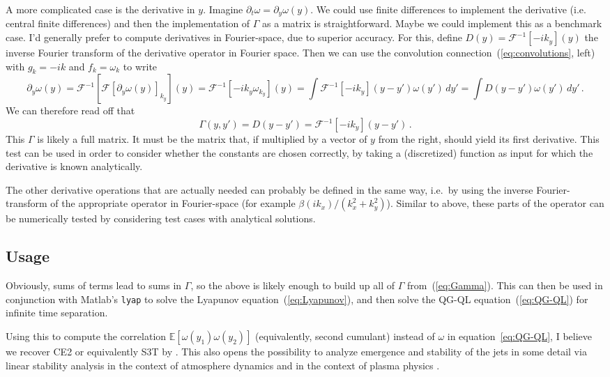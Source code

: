 \documentclass[11pt,reqno,a4paper]{amsart}
\newcommand{\EE}{\mathbb{E}}
\theoremstyle{definition}
\begin{document}
A more complicated case is the derivative in $y$. Imagine $\partial_t
\omega = \partial_y \omega(y)$. We could use finite differences to
implement the derivative (i.e. central finite differences) and then
the implementation of $\Gamma$ as a matrix is straightforward. Maybe
we could implement this as a benchmark case. I'd generally prefer to
compute derivatives in Fourier-space, due to superior accuracy. For
this, define $D(y) = \mathcal F^{-1}[-ik_y](y)$ the inverse Fourier
transform of the derivative operator in Fourier space. Then we can use
the convolution connection~(\ref{eq:convolutions}, left) with $g_k =
-ik$ and $f_k = \omega_k$ to write
\begin{equation}
  \partial_y \omega(y) = \mathcal F^{-1}\left[\mathcal F[\partial_y \omega(y)]_{k_y}\right](y) = \mathcal F^{-1}\left[ -ik_y \omega_{k_y}\right](y) = \int \mathcal F^{-1}[-ik_y](y-y') \omega(y')\,dy' = \int D(y-y') \omega(y')\,dy'\,.
\end{equation}
We can therefore read off that
\begin{equation}
  \Gamma(y,y') = D(y-y') = \mathcal F^{-1}[-ik_y](y-y')\,.
\end{equation}
This $\Gamma$ is likely a full matrix. It must be the matrix that, if
multiplied by a vector of $y$ from the right, should yield its first
derivative. This test can be used in order to consider whether the
constants are chosen correctly, by taking a (discretized) function as
input for which the derivative is known analytically.

The other derivative operations that are actually needed can probably
be defined in the same way, i.e.~by using the inverse
Fourier-transform of the appropriate operator in Fourier-space (for
example $\beta (ik_x)/(k_x^2 + k_y^2)$). Similar to above, these parts
of the operator can be numerically tested by considering test cases
with analytical solutions.

\subsection{Usage}

Obviously, sums of terms lead to sums in $\Gamma$, so the above is
likely enough to build up all of $\Gamma$ from~(\ref{eq:Gamma}). This
can then be used in conjunction with Matlab's \texttt{lyap} to solve
the Lyapunov equation~(\ref{eq:Lyapunov}), and then solve the QG-QL
equation~(\ref{eq:QG-QL}) for infinite time separation.

Using this to compute the correlation
$\EE\left[\omega(y_1)\omega(y_2)\right]$ (equivalently, second
cumulant) instead of $\omega$ in equation~\eqref{eq:QG-QL}, I believe
we recover CE2 \cite{marston-conover-schneider:2008} or equivalently
S3T by \cite{farrell-ioannou:2003, farrell-ioannou:2007}. This also
opens the possibility to analyze emergence and stability of the jets
in some detail via linear stability analysis in the context of
atmosphere dynamics \cite{bakas-ioannou:2011, bakas-ioannou:2013} and
in the context of plasma physics \cite{parker-krommes:2013,
  parker-krommes:2014}.

\begin{multicols}{2}
  \footnotesize
  \setlength{\bibsep}{0.0pt}
  
  
  
\end{multicols}
\end{document}
